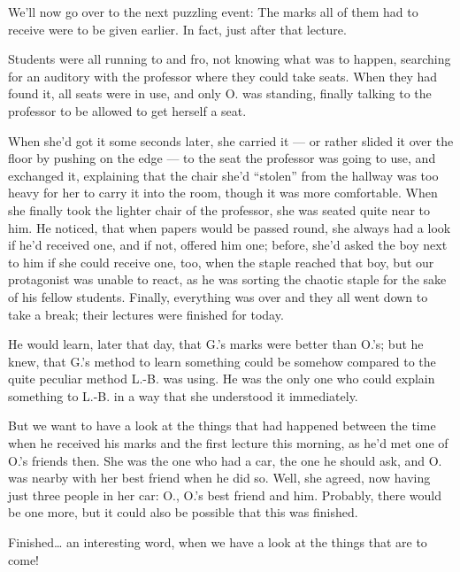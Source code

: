 We'll now go over to the next puzzling event: The marks all of them had to receive were to be given earlier. 
In fact, just after that lecture.

Students were all running to and fro, not knowing what was to happen, searching for an auditory with the professor where they could take seats. 
When they had found it, all seats were in use, and only O. was standing, finally talking to the professor to be allowed to get herself a seat.

When she'd got it some seconds later, she carried it --- or rather slided it over the floor by pushing on the edge --- to the seat the professor was going to use, and exchanged it, explaining that the chair she'd \enquote{stolen} from the hallway was too heavy for her to carry it into the room, though it was more comfortable. When she finally took the lighter chair of the professor, she was seated quite near to him. 
He noticed, that when papers would be passed round, she always had a look if he'd received one, and if not, offered him one; before, she'd asked the boy next to him if she could receive one, too, when the staple reached that boy, but our protagonist was unable to react, as he was sorting the chaotic staple for the sake of his fellow students. 
Finally, everything was over and they all went down to take a break; their lectures were finished for today.

He would learn, later that day, that G.'s marks were better than O.'s; but he knew, that G.'s method to learn something could be somehow compared to the quite peculiar method L.-B. was using. He was the only one who could explain something to L.-B. in a way that she understood it immediately.

But we want to have a look at the things that had happened between the time when he received his marks and the first lecture this morning, as he'd met one of O.'s friends then. 
She was the one who had a car, the one he should ask, and O. was nearby with her best friend when he did so. Well, she agreed, now having just three people in her car: O., O.'s best friend and him. Probably, there would be one more, but it could also be possible that this was finished.

Finished\dots{}
an interesting word, when we have a look at the things that are to come!

